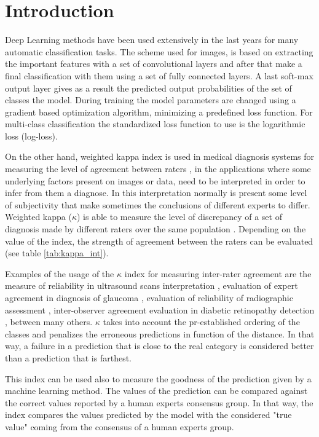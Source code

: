 \documentclass[times,twocolumn,final,authoryear]{elsarticle}
\begin{document}

\section{Introduction}

Deep Learning methods have been used extensively in the last years for many automatic classification tasks. The scheme used for images, is based on extracting the important features with a set of convolutional layers and after that make a final classification with them using a set of fully connected layers. A last soft-max output layer gives as a result the predicted output probabilities of the set of classes the model. During training the model parameters are changed using a gradient based optimization algorithm, minimizing a predefined loss function. For multi-class classification the standardized loss function to use is the logarithmic loss (log-loss).

On the other hand, weighted kappa index is used in medical diagnosis systems for measuring the level of agreement between raters \citep{hripcsak2002measuring}, in the applications where some underlying factors present on images or data, need to be interpreted in order to infer from them a diagnose. In this interpretation normally is present some level of subjectivity that make sometimes the conclusions of different experts to differ. Weighted kappa ($\kappa$) is able to measure the level of discrepancy of a set of diagnosis made by different raters over the same population \citep{viera2005understanding}. Depending on the value of the index, the strength of agreement between the raters can be evaluated (see table \ref{tab:kappa_int}). 

Examples of the usage of the $\kappa$ index for measuring inter-rater agreement are the measure of reliability in ultrasound scans interpretation \citep{hintz2007interobserver}, evaluation of expert agreement in diagnosis of glaucoma \citep{varma1992expert}, evaluation of reliability of radiographic assessment \citep{gunther1999reliability}, inter-observer agreement evaluation in diabetic retinopathy detection \citep{patra2009interobserver}, between many others. $\kappa$ takes into account the pr-established ordering of the classes and penalizes the erroneous predictions in function of the distance. In that way, a failure in a prediction that is close to the real category is considered better than a prediction that is farthest. 

This index can be used also to measure the goodness of the prediction given by a machine learning method. The values of the prediction can be compared against the correct values reported by a human experts consensus group. In that way, the index compares the values predicted by the model with the considered "true value" coming from the consensus of a human experts group.
\end{document}
